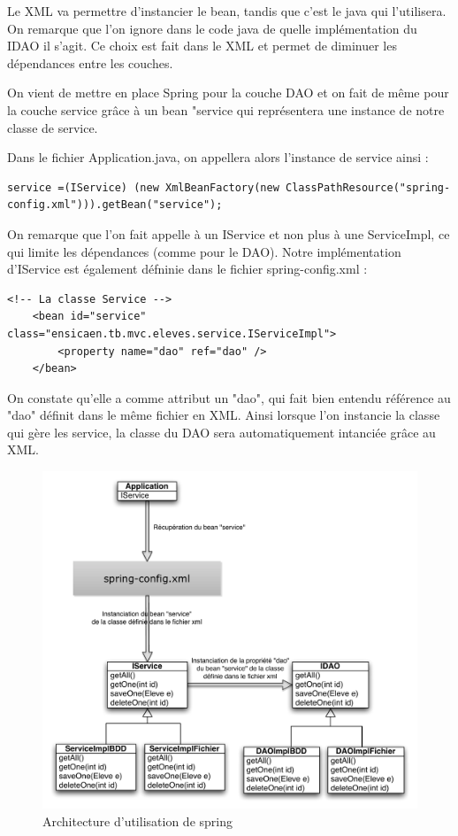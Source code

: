 \documentclass[a4paper,12pt]{article}
\begin{document}
Le XML va permettre d'instancier le bean, tandis que c'est le java qui l'utilisera.
On remarque que l'on ignore dans le code java de quelle implémentation du IDAO il s'agit. Ce choix est fait dans le XML et permet de diminuer les dépendances entre les couches.

On vient de mettre en place Spring pour la couche DAO et on fait de même pour la couche service grâce à un bean "service qui représentera une instance de notre classe de service.

Dans le fichier Application.java, on appellera alors l'instance de service ainsi : 

\begin{lstlisting}
service =(IService) (new XmlBeanFactory(new ClassPathResource("spring-config.xml"))).getBean("service");
\end{lstlisting}

On remarque que l'on fait appelle à un IService et non plus à une ServiceImpl, ce qui limite les dépendances (comme pour le DAO).
Notre implémentation d'IService est également défninie dans le fichier spring-config.xml :

\begin{lstlisting}
<!-- La classe Service -->
	<bean id="service" class="ensicaen.tb.mvc.eleves.service.IServiceImpl">
		<property name="dao" ref="dao" />
	</bean>
\end{lstlisting}

On constate qu'elle a comme attribut un "dao", qui fait bien entendu référence au "dao" définit dans le même fichier en XML. Ainsi lorsque l'on
instancie la classe qui gère les service, la classe du DAO sera automatiquement intanciée grâce au XML.

\begin{figure}[H]
	\center
	\includegraphics[width=15cm]{img/spring.pdf}
	\caption{Architecture d'utilisation de spring}
\end{figure}
\newpage
\end{document}
